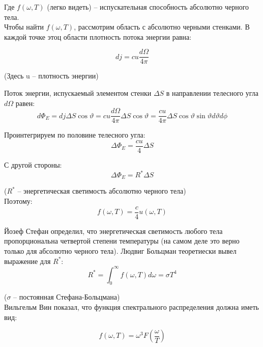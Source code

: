 \documentclass{article}
\begin{document}
	Где $f(\omega,T)$ (легко видеть) -- испускательная способность абсолютно черного тела.\\

	Чтобы найти $f(\omega,T)$, рассмотрим область с абсолютно черными стенками. В каждой точке этоц области плотность потока энергии равна:

	\begin{equation}
		dj = cu\frac{d\Omega}{4\pi}
	\end{equation}

	(Здесь u -- плотность энергии)

	Поток энергии, испускаемый элементом стенки $\Delta S$ в направлении телесного угла $d\Omega$ равен:
	\begin{equation}
		d\Phi_E = dj\Delta S \cos \vartheta = cu \frac{d\Omega}{4\pi}\Delta S \cos \vartheta = \frac{cu}{4\pi}\Delta S\cos \vartheta \sin \vartheta d\vartheta d\phi
	\end{equation}

	Проинтегрируем по половине телесного угла:
	\begin{equation}
		\Delta\Phi_E = \frac{cu}{4}\Delta S
	\end{equation}

	С другой стороны:
	\begin{equation}
		\Delta\Phi_E = R^*\Delta S
	\end{equation}

	($R^*$ -- энергетическая светимость абсолютно черного тела)\\

	Поэтому:
	\begin{equation}
		f(\omega,T)=\frac{c}{4}u(\omega,T)
	\end{equation}

	Йозеф Стефан определил, что энергетическая светимость любого тела пропорциональна четвертой степени температуры (на самом деле это верно только для абсолютно черного тела). Людвиг Больцман теоретиески вывел выражение для $R^*$:
	\begin{equation}
		R^* = \int_0^\infty f(\omega,T)d\omega = \sigma T^4
	\end{equation}

	($\sigma$ -- постоянная Стефана-Больцмана)\\

	Вильгельм Вин показал, что функция спектрального распределения должна иметь вид:
	
	\begin{equation}
		f(\omega,T)=\omega^3 F(\frac{\omega}{T})
	\end{equation}
\end{document}
